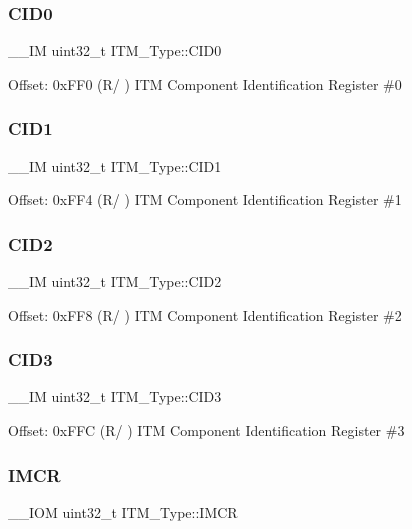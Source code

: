 \subsubsection{\texorpdfstring{CID0}{CID0}}
{\footnotesize\ttfamily \+\_\+\+\_\+\+IM uint32\+\_\+t I\+T\+M\+\_\+\+Type\+::\+C\+I\+D0}

Offset\+: 0x\+F\+F0 (R/ ) I\+TM Component Identification Register \#0 \mbox{\label{structITM__Type_ac40df2c3a6cef02f90b4e82c8204756f}} 
\subsubsection{\texorpdfstring{CID1}{CID1}}
{\footnotesize\ttfamily \+\_\+\+\_\+\+IM uint32\+\_\+t I\+T\+M\+\_\+\+Type\+::\+C\+I\+D1}

Offset\+: 0x\+F\+F4 (R/ ) I\+TM Component Identification Register \#1 \mbox{\label{structITM__Type_a8000b92e4e528ae7ac4cb8b8d9f6757d}} 
\subsubsection{\texorpdfstring{CID2}{CID2}}
{\footnotesize\ttfamily \+\_\+\+\_\+\+IM uint32\+\_\+t I\+T\+M\+\_\+\+Type\+::\+C\+I\+D2}

Offset\+: 0x\+F\+F8 (R/ ) I\+TM Component Identification Register \#2 \mbox{\label{structITM__Type_a43451f43f514108d9eaed5b017f8d921}} 
\subsubsection{\texorpdfstring{CID3}{CID3}}
{\footnotesize\ttfamily \+\_\+\+\_\+\+IM uint32\+\_\+t I\+T\+M\+\_\+\+Type\+::\+C\+I\+D3}

Offset\+: 0x\+F\+FC (R/ ) I\+TM Component Identification Register \#3 \mbox{\label{structITM__Type_ae2ce4d3a54df2fd11a197ccac4406cd0}} 
\subsubsection{\texorpdfstring{IMCR}{IMCR}}
{\footnotesize\ttfamily \+\_\+\+\_\+\+I\+OM uint32\+\_\+t I\+T\+M\+\_\+\+Type\+::\+I\+M\+CR}

